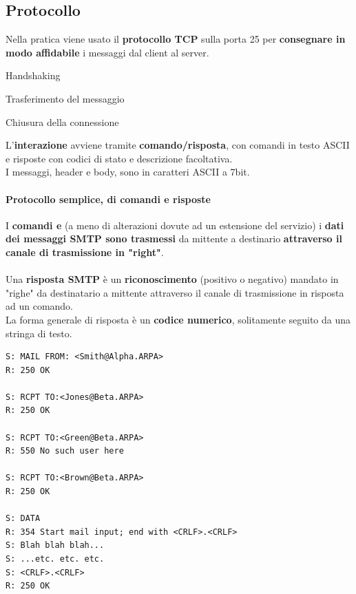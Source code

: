 \documentclass[10pt]{article}
\begin{document}
\subsection{Protocollo}
Nella pratica viene usato il \textbf{protocollo TCP} sulla porta 25 per \textbf{consegnare in modo affidabile} i messaggi dal client al server.
\begin{list}{}{Questo avviene in tre fasi:}
\item Handshaking
\item Trasferimento del messaggio
\item Chiusura della connessione
\end{list}
L'\textbf{interazione} avviene tramite \textbf{comando/risposta}, con comandi in testo ASCII e risposte con codici di stato e descrizione facoltativa.\\
I messaggi, header e body, sono in caratteri ASCII a 7bit.
\pagebreak
\begin{multicols}{2}
\paragraph{Protocollo semplice, di comandi e risposte}
I \textbf{comandi e} (a meno di alterazioni dovute ad un estensione del servizio) i \textbf{dati dei messaggi SMTP sono trasmessi} da mittente a destinario \textbf{attraverso il canale di trasmissione in "right"}.\\\\
Una \textbf{risposta SMTP} è un \textbf{riconoscimento} (positivo o negativo) mandato in "righe" da destinatario a mittente attraverso il canale di trasmissione in risposta ad un comando.\\
La forma generale di risposta è un \textbf{codice numerico}, solitamente seguito da una stringa di testo.
\columnbreak
\begin{verbatim}
S: MAIL FROM: <Smith@Alpha.ARPA>
R: 250 OK

S: RCPT TO:<Jones@Beta.ARPA>
R: 250 OK

S: RCPT TO:<Green@Beta.ARPA>
R: 550 No such user here

S: RCPT TO:<Brown@Beta.ARPA>
R: 250 OK

S: DATA
R: 354 Start mail input; end with <CRLF>.<CRLF>
S: Blah blah blah...
S: ...etc. etc. etc.
S: <CRLF>.<CRLF>
R: 250 OK
\end{verbatim}
\end{multicols}
\end{document}
